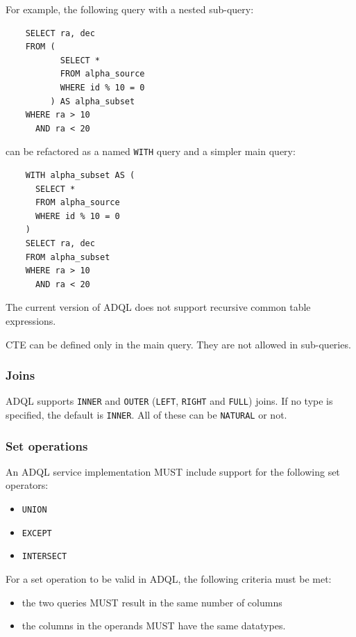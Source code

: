 \documentclass[11pt,a4paper]{ivoa}
\begin{document}
For example, the following query with a nested sub-query:
\begin{verbatim}
    SELECT ra, dec
    FROM (
           SELECT *
           FROM alpha_source
           WHERE id % 10 = 0
         ) AS alpha_subset
    WHERE ra > 10
      AND ra < 20
\end{verbatim}

can be refactored as a named \texttt{WITH} query and a simpler main query:

\begin{verbatim}
    WITH alpha_subset AS (
      SELECT *
      FROM alpha_source
      WHERE id % 10 = 0
    )
    SELECT ra, dec
    FROM alpha_subset
    WHERE ra > 10
      AND ra < 20
\end{verbatim}

The current version of ADQL does not support recursive common table expressions.


CTE can be defined only in the main query. They are not allowed in sub-queries.

\subsubsection{Joins}
\label{sec:joins}

ADQL supports \verb:INNER: and \verb:OUTER:
(\verb:LEFT:, \verb:RIGHT: and \verb:FULL:) joins. If no type is specified, the
default is \verb:INNER:. All of these can be \verb:NATURAL: or not.


\subsubsection{Set operations}
\label{sec:set.operators}

An ADQL service implementation MUST include support for the following set
operators:

\begin{itemize}
    \item \verb:UNION:
    \item \verb:EXCEPT:
    \item \verb:INTERSECT:
\end{itemize}

For a set operation to be valid in ADQL, the following criteria must be met:
\begin{itemize}
    \item the two queries MUST result in the same number of columns
    \item the columns in the operands MUST have the same datatypes.
\end{itemize}
\end{document}
